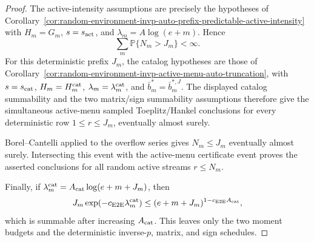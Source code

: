 \documentclass[11pt]{amsart}
\numberwithin{equation}{section}
\theoremstyle{definition}
\theoremstyle{remark}
\newcommand{\Prob}{\mathbb P}
\begin{document}
\begin{proof}
The active-intensity assumptions are precisely the hypotheses of
Corollary~\ref{cor:random-environment-invp-auto-prefix-predictable-active-intensity}
with \(H_m=G_m\), \(s=s_{\rm act}\), and
\(\lambda_m=A\log(e+m)\).  Hence
\[
  \sum_m\Prob\{N_m>J_m\}<\infty .
\]
For this deterministic prefix \(J_m\), the catalog hypotheses are those of
Corollary~\ref{cor:random-environment-invp-active-menu-auto-truncation}, with
\(s=s_{\rm cat}\), \(H_m=H_m^{\rm cat}\),
\(\lambda_m=\lambda_m^{\rm cat}\), and
\(\bar b_m^*=\bar b_m^{*,J}\).
The displayed catalog summability and the two matrix/sign summability
assumptions therefore give the simultaneous active-menu sampled Toeplitz/Hankel
conclusions for every deterministic row \(1\le r\le J_m\), eventually almost
surely.

Borel--Cantelli applied to the overflow series gives \(N_m\le J_m\) eventually
almost surely.  Intersecting this event with the active-menu certificate event
proves the asserted conclusions for all random active streams \(r\le N_m\).

Finally, if \(\lambda_m^{\rm cat}=A_{\rm cat}\log(e+m+J_m)\), then
\[
  J_m\exp(-c_{\rm E2E}\lambda_m^{\rm cat})
  \le
  (e+m+J_m)^{1-c_{\rm E2E}A_{\rm cat}},
\]
which is summable after increasing \(A_{\rm cat}\).  This leaves only the two
moment budgets and the deterministic inverse-\(p\), matrix, and sign schedules.
\end{proof}
\end{document}
